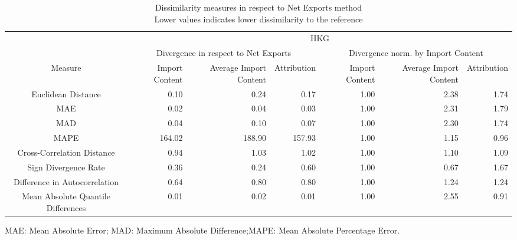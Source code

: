 \begin{table}[t]
\caption*{
{\large Dissimilarity measures in respect to Net Exports method} \\ 
{\small Lower values indicates lower dissimilarity to the reference}
} 
\fontsize{15.0pt}{18.0pt}\selectfont
\begin{tabular*}{\linewidth}{@{\extracolsep{\fill}}crrrrrr}
\toprule
 & \multicolumn{6}{c}{HKG} \\ 
\cmidrule(lr){2-7}
 & \multicolumn{3}{c}{Divergence in respect to Net Exports} & \multicolumn{3}{c}{Divergence norm. by Import Content} \\ 
\cmidrule(lr){2-4} \cmidrule(lr){5-7}
Measure & Import Content & Average Import Content & Attribution & Import Content & Average Import Content & Attribution \\ 
\midrule\addlinespace[2.5pt]
Euclidean Distance & 0.10 & 0.24 & 0.17 & 1.00 & 2.38 & 1.74 \\ 
MAE & 0.02 & 0.04 & 0.03 & 1.00 & 2.31 & 1.79 \\ 
MAD & 0.04 & 0.10 & 0.07 & 1.00 & 2.30 & 1.74 \\ 
MAPE & 164.02 & 188.90 & 157.93 & 1.00 & 1.15 & 0.96 \\ 
Cross-Correlation Distance & 0.94 & 1.03 & 1.02 & 1.00 & 1.10 & 1.09 \\ 
Sign Divergence Rate & 0.36 & 0.24 & 0.60 & 1.00 & 0.67 & 1.67 \\ 
Difference in Autocorrelation & 0.64 & 0.80 & 0.80 & 1.00 & 1.24 & 1.24 \\ 
Mean Absolute Quantile Differences & 0.01 & 0.02 & 0.01 & 1.00 & 2.55 & 0.91 \\ 
\bottomrule
\end{tabular*}
\begin{minipage}{\linewidth}
MAE: Mean Absolute Error; MAD: Maximum Absolute Difference;MAPE: Mean Absolute Percentage Error.\\
\end{minipage}
\end{table}

